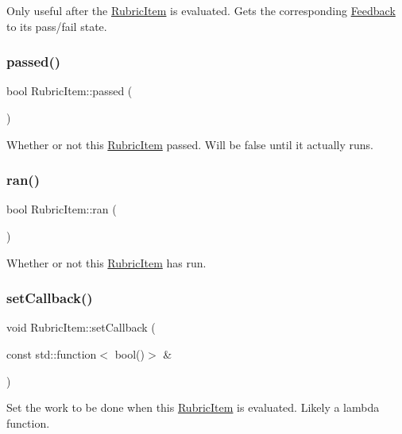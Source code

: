 Only useful after the \hyperlink{class_rubric_item}{Rubric\+Item} is evaluated. Gets the corresponding \hyperlink{class_feedback}{Feedback} to its pass/fail state. \hypertarget{class_rubric_item_a0b3f8d8fd8cf27e9684510da51a58d6e}{}\label{class_rubric_item_a0b3f8d8fd8cf27e9684510da51a58d6e} 
\subsubsection{\texorpdfstring{passed()}{passed()}}
{\footnotesize\ttfamily bool Rubric\+Item\+::passed (\begin{DoxyParamCaption}{ }\end{DoxyParamCaption})}

Whether or not this \hyperlink{class_rubric_item}{Rubric\+Item} passed. Will be false until it actually runs. \hypertarget{class_rubric_item_a96a9432a63552a832a9a8b3b422402e1}{}\label{class_rubric_item_a96a9432a63552a832a9a8b3b422402e1} 
\subsubsection{\texorpdfstring{ran()}{ran()}}
{\footnotesize\ttfamily bool Rubric\+Item\+::ran (\begin{DoxyParamCaption}{ }\end{DoxyParamCaption})}

Whether or not this \hyperlink{class_rubric_item}{Rubric\+Item} has run. \hypertarget{class_rubric_item_a29bf17ee6e15089b388cca8af88dfc4e}{}\label{class_rubric_item_a29bf17ee6e15089b388cca8af88dfc4e} 
\subsubsection{\texorpdfstring{set\+Callback()}{setCallback()}}
{\footnotesize\ttfamily void Rubric\+Item\+::set\+Callback (\begin{DoxyParamCaption}\item[{const std\+::function$<$ bool()$>$ \&}]{ }\end{DoxyParamCaption})}

Set the work to be done when this \hyperlink{class_rubric_item}{Rubric\+Item} is evaluated. Likely a lambda function. \hypertarget{class_rubric_item_ac12fa4604d6d09e643e1aadec0a1e8ce}{}\label{class_rubric_item_ac12fa4604d6d09e643e1aadec0a1e8ce} 
